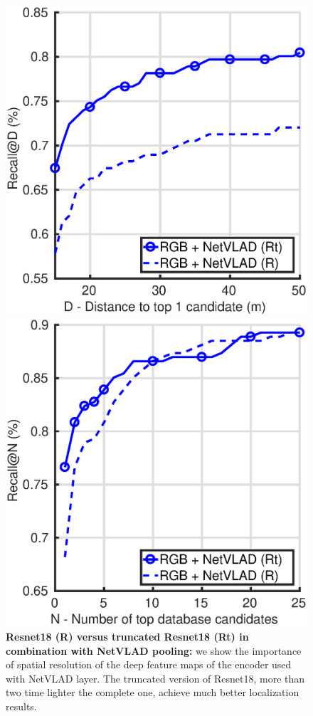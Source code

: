 \begin{figure}
	\center
	\begin{minipage}{0.49\linewidth}
		\includegraphics[width=\linewidth]{plot/fig/rgb_r_trunc_distance}	
	\end{minipage}
	\begin{minipage}{0.49\linewidth}
		\includegraphics[width=\linewidth]{plot/fig/rgb_r_trunc_recall}	
	\end{minipage}
	\caption{\label{fig:trunc_resnet} \textbf{Resnet18 (R) versus truncated Resnet18 (Rt) in combination with NetVLAD pooling:} we show the importance of spatial resolution of the deep feature maps of the encoder used with NetVLAD layer. The truncated version of Resnet18, more than two time lighter the complete one, achieve much better localization results.}
\end{figure}

